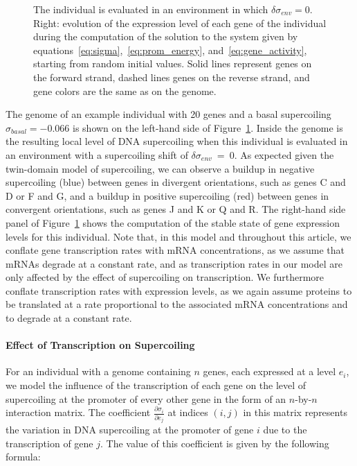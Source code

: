 \begin{figure}[H]
{  The individual is evaluated in an environment in which $\delta\sigma_{env} = 0$.
  Right: evolution of the expression level of each gene of the individual during the computation of the solution to the system given by equations~\ref{eq:sigma},~\ref{eq:prom_energy}, and~\ref{eq:gene_activity}, starting from random initial values.
  Solid lines represent genes on the forward strand, dashed lines genes on the reverse strand, and gene colors are the same as on the genome.}
  \label{fig:ploscb:random_indiv}
\end{figure}

The genome of an example individual with 20 genes and a basal supercoiling $\sigma_{basal} = -0.066$ is shown on the left-hand side of Figure~\ref{fig:ploscb:random_indiv}.
Inside the genome is the resulting local level of DNA supercoiling when this individual is evaluated in an environment with a supercoiling shift of $\delta\sigma_{env}~=~0$.
As expected given the twin-domain model of supercoiling, we can observe a buildup in negative supercoiling (blue) between genes in divergent orientations, such as genes C and D or F and G, and a buildup in positive supercoiling (red) between genes in convergent orientations, such as genes J and K or Q and R.
The right-hand side panel of Figure~\ref{fig:ploscb:random_indiv} shows the computation of the stable state of gene expression levels for this individual.
Note that, in this model and throughout this article, we conflate
gene transcription rates with mRNA concentrations, as we assume that mRNAs degrade at a constant rate, and as transcription rates in our model are only affected by the effect of supercoiling on transcription.
We furthermore conflate transcription rates with expression levels, as we again assume proteins to be translated at a rate proportional to the associated mRNA concentrations and to degrade at a constant rate.

\paragraph{Effect of Transcription on Supercoiling}
For an individual with a genome containing $n$ genes, each expressed at a level $e_i$, we model the influence of the transcription of each gene on the level of supercoiling at the promoter of every other gene in the form of an $n$-by-$n$ interaction matrix.
The coefficient $\frac{\partial\sigma_i}{\partial e_j}$ at indices $(i, j)$ in this matrix represents the variation in DNA supercoiling at the promoter of gene $i$ due to the transcription of gene $j$.
The value of this coefficient is given by the following formula:

